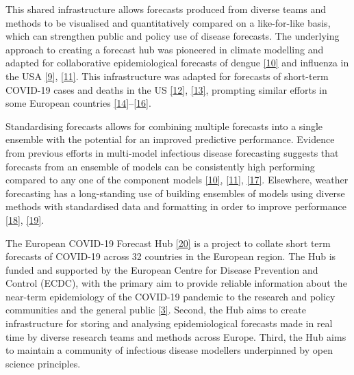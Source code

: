 \documentclass[
]{article}
\begin{document}
This shared infrastructure allows forecasts produced from diverse teams and methods to be visualised and quantitatively compared on a like-for-like basis, which can strengthen public and policy use of disease forecasts. The underlying approach to creating a forecast hub was pioneered in climate modelling and adapted for collaborative epidemiological forecasts of dengue \protect\hyperlink{ref-johanssonOpenChallengeAdvance2019}{{[}10{]}} and influenza in the USA \protect\hyperlink{ref-reichCollaborativeMultiyearMultimodel2019}{{[}9{]}}, \protect\hyperlink{ref-reichAccuracyRealtimeMultimodel2019}{{[}11{]}}. This infrastructure was adapted for forecasts of short-term COVID-19 cases and deaths in the US \protect\hyperlink{ref-cramerUnitedStatesCOVID192021}{{[}12{]}}, \protect\hyperlink{ref-rayEnsembleForecastsCoronavirus2020e}{{[}13{]}}, prompting similar efforts in some European countries \protect\hyperlink{ref-bracherPreregisteredShorttermForecasting2021}{{[}14{]}}--\protect\hyperlink{ref-bicherSupportingCOVID19PolicyMaking2021}{{[}16{]}}.

Standardising forecasts allows for combining multiple forecasts into a single ensemble with the potential for an improved predictive performance. Evidence from previous efforts in multi-model infectious disease forecasting suggests that forecasts from an ensemble of models can be consistently high performing compared to any one of the component models \protect\hyperlink{ref-johanssonOpenChallengeAdvance2019}{{[}10{]}}, \protect\hyperlink{ref-reichAccuracyRealtimeMultimodel2019}{{[}11{]}}, \protect\hyperlink{ref-viboudRAPIDDEbolaForecasting2018}{{[}17{]}}. Elsewhere, weather forecasting has a long-standing use of building ensembles of models using diverse methods with standardised data and formatting in order to improve performance \protect\hyperlink{ref-buizzaIntroductionSpecialIssue2019}{{[}18{]}}, \protect\hyperlink{ref-moranEpidemicForecastingMessier2016}{{[}19{]}}.

The European COVID-19 Forecast Hub \protect\hyperlink{ref-europeancovid-19forecasthubEuropeanCOVID19Forecast2021}{{[}20{]}} is a project to collate short term forecasts of COVID-19 across 32 countries in the European region. The Hub is funded and supported by the European Centre for Disease Prevention and Control (ECDC), with the primary aim to provide reliable information about the near-term epidemiology of the COVID-19 pandemic to the research and policy communities and the general public \protect\hyperlink{ref-europeancentrefordiseasepreventionandcontrolForecastingCOVID19Cases2021}{{[}3{]}}. Second, the Hub aims to create infrastructure for storing and analysing epidemiological forecasts made in real time by diverse research teams and methods across Europe. Third, the Hub aims to maintain a community of infectious disease modellers underpinned by open science principles.
\end{document}

